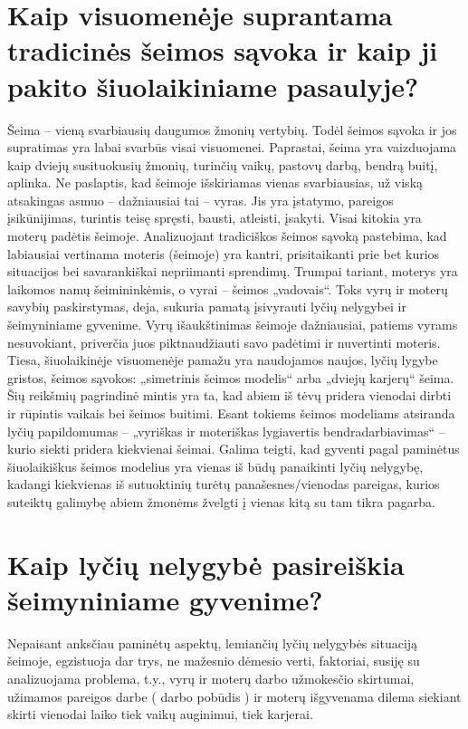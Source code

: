 \documentclass[titlepage, 11pt]{article}
\begin{document}
\section{Kaip visuomenėje suprantama tradicinės šeimos sąvoka ir kaip ji pakito šiuolaikiniame pasaulyje?}

Šeima – vieną svarbiausių daugumos žmonių vertybių. Todėl šeimos sąvoka ir jos supratimas yra labai svarbūs visai visuomenei. Paprastai, šeima yra vaizduojama kaip dviejų susituokusių žmonių, turinčių vaikų, pastovų darbą, bendrą buitį, aplinka. Ne paslaptis, kad šeimoje išskiriamas vienas svarbiausias, už viską atsakingas asmuo – dažniausiai tai – vyras. Jis yra įstatymo, pareigos įsikūnijimas, turintis teisę spręsti, bausti, atleisti, įsakyti. Visai kitokia yra moterų padėtis šeimoje. Analizuojant tradiciškos šeimos sąvoką pastebima, kad labiausiai vertinama moteris (šeimoje) yra kantri, prisitaikanti prie bet kurios situacijos bei savarankiškai nepriimanti sprendimų. Trumpai tariant, moterys yra laikomos namų šeimininkėmis, o vyrai – šeimos „vadovais“.\newline
Toks vyrų ir moterų savybių paskirstymas, deja, sukuria pamatą įsivyrauti lyčių nelygybei ir šeimyniniame gyvenime. Vyrų išaukštinimas šeimoje dažniausiai, patiems vyrams nesuvokiant, priverčia juos piktnaudžiauti savo padėtimi ir nuvertinti moteris. \newline
Tiesa, šiuolaikinėje visuomenėje pamažu yra naudojamos naujos, lyčių lygybe gristos, šeimos sąvokos: „simetrinis šeimos modelis“ arba „dviejų karjerų“ šeima. Šių reikšmių pagrindinė mintis yra ta, kad abiem iš tėvų pridera vienodai dirbti ir rūpintis vaikais bei šeimos buitimi. Esant tokiems šeimos modeliams atsiranda lyčių papildomumas – „vyriškas ir moteriškas lygiavertis bendradarbiavimas“ – kurio siekti pridera kiekvienai šeimai. Galima teigti, kad gyventi pagal paminėtus šiuolaikiškus šeimos modelius yra vienas iš būdų panaikinti lyčių nelygybę, kadangi kiekvienas iš sutuoktinių turėtų panašesnes/vienodas pareigas, kurios suteiktų galimybę abiem žmonėms žvelgti į vienas kitą su tam tikra pagarba.

\section{Kaip lyčių nelygybė pasireiškia šeimyniniame gyvenime?}

Nepaisant anksčiau paminėtų aspektų, lemiančių lyčių nelygybės situaciją šeimoje, egzistuoja dar trys, ne mažesnio dėmesio verti, faktoriai, susiję su analizuojama problema, t.y., vyrų ir moterų darbo užmokesčio skirtumai, užimamos pareigos darbe ( darbo pobūdis ) ir moterų išgyvenama dilema siekiant skirti vienodai laiko tiek vaikų auginimui, tiek karjerai.
\end{document}
